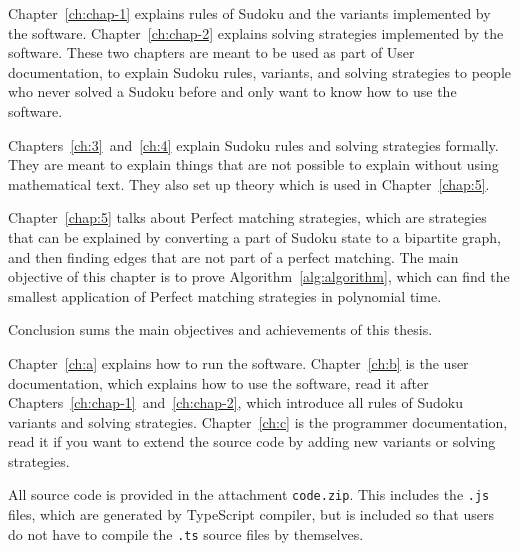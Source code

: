 
Chapter~\ref{ch:chap-1} explains rules of Sudoku and the variants implemented by the software.
Chapter~\ref{ch:chap-2} explains solving strategies implemented by the software.
These two chapters are meant to be used as part of User documentation,
to explain Sudoku rules, variants, and solving strategies to people who never solved a Sudoku before
and only want to know how to use the software.

Chapters~\ref{ch:3}~and~\ref{ch:4} explain Sudoku rules and solving strategies formally.
They are meant to explain things that are not possible to explain without using mathematical text.
They also set up theory which is used in Chapter~\ref{chap:5}.

Chapter~\ref{chap:5} talks about Perfect matching strategies,
which are strategies that can be explained by converting a part of Sudoku state to a bipartite graph,
and then finding edges that are not part of a perfect matching.
The main objective of this chapter is to prove Algorithm~\ref{alg:algorithm},
which can find the smallest application of Perfect matching strategies in polynomial time.

Conclusion sums the main objectives and achievements of this thesis.

Chapter~\ref{ch:a} explains how to run the software.
Chapter~\ref{ch:b} is the user documentation, which explains how to use the software,
read it after Chapters~\ref{ch:chap-1}~and~\ref{ch:chap-2},
which introduce all rules of Sudoku variants and solving strategies.
Chapter~\ref{ch:c} is the programmer documentation,
read it if you want to extend the source code by adding new variants or solving strategies.

All source code is provided in the attachment \texttt{code.zip}.
This includes the \texttt{.js} files, which are generated by TypeScript compiler,
but is included so that users do not have to compile the \texttt{.ts} source files by themselves.
